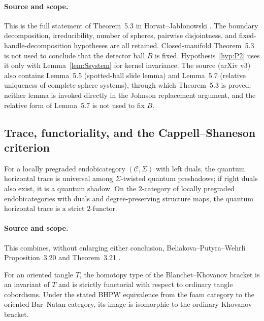 \paragraph{Source and scope.}
This is the full statement of Theorem~5.3 in
Horvat--Jab\l onowski \cite[Theorem~5.3]{HorvatJablonowski2025}.
The boundary decomposition, irreducibility, number of spheres, pairwise
disjointness, and fixed-handle-decomposition hypotheses are all retained.
Closed-manifold Theorem~5.3 is not used to conclude that the detector ball
$B$ is fixed.  Hypothesis~\ref{hyp:P2} uses it only with
Lemma~\ref{lem:Ssystem} for kernel invariance.  The source (arXiv v3) also
contains Lemma~5.5 (spotted-ball slide lemma) and Lemma~5.7 (relative
uniqueness of complete sphere systems), through which Theorem~5.3 is
proved; neither lemma is invoked directly in the Johnson replacement
argument, and the relative form of Lemma~5.7 is not used to fix $B$.

\subsection{Trace, functoriality, and the Cappell--Shaneson criterion}

\begin{externalresult}\label{prop:bpw-trace}
For a locally pregraded endobicategory $(\mathcal C,\Sigma)$ with left duals,
the quantum horizontal trace is universal among $\Sigma$-twisted quantum
preshadows; if right duals also exist, it is a quantum shadow.  On the
$2$-category of locally pregraded endobicategories with duals and
degree-preserving structure maps, the quantum horizontal trace is a strict
$2$-functor.
\end{externalresult}

\paragraph{Source and scope.}
This combines, without enlarging either conclusion, Beliakova--Putyra--Wehrli
Proposition~3.20 and Theorem~3.21
\cite[Proposition~3.20 and Theorem~3.21]{BeliakovaPutyraWehrli2019}.

\begin{externalresult}\label{prop:bhpw}
For an oriented tangle $T$, the homotopy type of the Blanchet--Khovanov
bracket is an invariant of $T$ and is strictly functorial with respect to
ordinary tangle cobordisms.  Under the stated BHPW equivalence from the foam
category to the oriented Bar--Natan category, its image is isomorphic to the
ordinary Khovanov bracket.
\end{externalresult}

